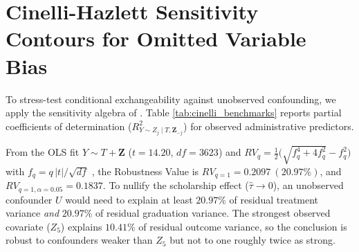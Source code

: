 \section{Cinelli-Hazlett Sensitivity Contours for Omitted Variable Bias}
\label{sec:adv_sensitivity}

To stress-test conditional exchangeability against unobserved confounding, we apply the sensitivity algebra of \textcite{cinelli2020making}. Table \ref{tab:cinelli_benchmarks} reports partial coefficients of determination ($R^2_{Y \sim Z_j \mid T, \mathbf{Z}_{-j}}$) for observed administrative predictors.

\begin{table}[htbp]
    \centering
    \small
    \caption{Observed Covariate Benchmarks for Cinelli-Hazlett Sensitivity Audit.}
    \label{tab:cinelli_benchmarks}
\end{table}

From the OLS fit $Y \sim T + \mathbf{Z}$ ($t = 14.20$, $df = 3623$) and $RV_q = \tfrac12\big(\sqrt{f_q^4 + 4 f_q^2} - f_q^2\big)$ with $f_q = q\,|t|/\sqrt{df}$ \parencite{cinelli2020making}, the Robustness Value is $RV_{q=1} = \mathbf{0.2097\ (20.97\%)}$, and $RV_{q=1,\alpha=0.05} = 0.1837$. To nullify the scholarship effect ($\hat{\tau} \to 0$), an unobserved confounder $U$ would need to explain at least $20.97\%$ of residual treatment variance \emph{and} $20.97\%$ of residual graduation variance. The strongest observed covariate ($Z_5$) explains $10.41\%$ of residual outcome variance, so the conclusion is robust to confounders weaker than $Z_5$ but not to one roughly twice as strong.
